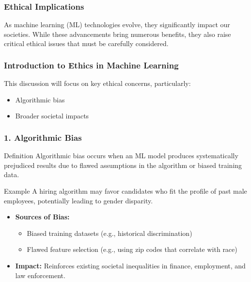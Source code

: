 \documentclass[aspectratio=169]{beamer}
\begin{document}
\begin{frame}[fragile]
    \frametitle{Ethical Implications}
    As machine learning (ML) technologies evolve, they significantly impact our societies. While these advancements bring numerous benefits, they also raise critical ethical issues that must be carefully considered.
\end{frame}

\begin{frame}[fragile]
    \frametitle{Introduction to Ethics in Machine Learning}
    This discussion will focus on key ethical concerns, particularly:
    \begin{itemize}
        \item Algorithmic bias
        \item Broader societal impacts
    \end{itemize}
\end{frame}

\begin{frame}[fragile]
    \frametitle{1. Algorithmic Bias}
    \begin{block}{Definition}
        Algorithmic bias occurs when an ML model produces systematically prejudiced results due to flawed assumptions in the algorithm or biased training data.
    \end{block}
    
    \begin{block}{Example}
        A hiring algorithm may favor candidates who fit the profile of past male employees, potentially leading to gender disparity.
    \end{block}
    
    \begin{itemize}
        \item \textbf{Sources of Bias:}
            \begin{itemize}
                \item Biased training datasets (e.g., historical discrimination)
                \item Flawed feature selection (e.g., using zip codes that correlate with race)
            \end{itemize}
        \item \textbf{Impact:} Reinforces existing societal inequalities in finance, employment, and law enforcement.
    \end{itemize}
\end{frame}
\end{document}
